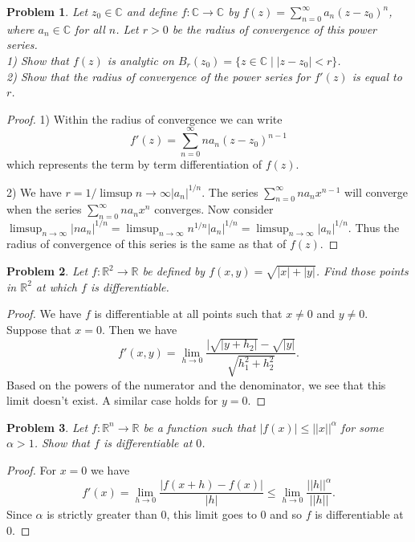 \documentclass{article}
\newtheorem{problem}{Problem}
\begin{document}
\begin{flushleft}
\begin{problem}
Let $z_0 \in \mathbb{C}$ and define $f : \mathbb{C} \rightarrow \mathbb{C}$ by $f(z) = \sum_{n=0}^{\infty} a_n (z-z_0)^n$, where $a_n \in \mathbb{C}$ for all $n$. Let $r > 0$ be the radius of convergence of this power series.\\
1) Show that $f(z)$ is analytic on $B_r(z_0) = \{z \in \mathbb{C} \mid |z-z_0| < r\}$.\\
2) Show that the radius of convergence of the power series for $f'(z)$ is equal to $r$.
\end{problem}
\begin{proof}
1) Within the radius of convergence we can write
\[
f'(z) = \sum_{n=0}^{\infty} n a_n (z - z_0)^{n-1}
\]
which represents the term by term differentiation of $f(z)$.\newline

2) We have $r = 1/\limsup{n \rightarrow \infty} |a_n|^{1/n}$. The series $\sum_{n=0}^{\infty} n a_n x^{n-1}$ will converge when the series $\sum_{n=0}^{\infty} n a_n x^n$ converges. Now consider $\limsup_{n \rightarrow \infty} |na_n|^{1/n} = \limsup_{n \rightarrow \infty} n^{1/n} |a_n|^{1/n} = \limsup_{n \rightarrow \infty} |a_n|^{1/n}$. Thus the radius of convergence of this series is the same as that of $f(z)$.
\end{proof}

\begin{problem}
Let $f : \mathbb{R}^2 \rightarrow \mathbb{R}$ be defined by $f(x,y) = \sqrt{|x| + |y|}$. Find those points in $\mathbb{R}^2$ at which $f$ is differentiable.
\end{problem}
\begin{proof}
We have $f$ is differentiable at all points such that $x \neq 0$ and $y \neq 0$. Suppose that $x = 0$. Then we have
\[
f'(x,y) = \lim_{h \rightarrow 0} \frac{|\sqrt{|y+h_2|} - \sqrt{|y|}}{\sqrt{h_1^2 + h_2^2}}.
\]
Based on the powers of the numerator and the denominator, we see that this limit doesn't exist. A similar case holds for $y = 0$.
\end{proof}

\begin{problem}
Let $f : \mathbb{R}^n \rightarrow \mathbb{R}$ be a function such that $|f(x)| \leq ||x||^{\alpha}$ for some $\alpha > 1$. Show that $f$ is differentiable at $0$.
\end{problem}
\begin{proof}
For $x = 0$ we have
\[
f'(x) = \lim_{h \rightarrow 0} \frac{|f(x + h) - f(x)|}{|h|} \leq \lim_{h \rightarrow 0} \frac{||h||^{\alpha}}{||h||}.
\]
Since $\alpha$ is strictly greater than $0$, this limit goes to $0$ and so $f$ is differentiable at $0$.
\end{proof}


\end{flushleft}
\end{document}
